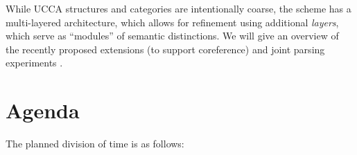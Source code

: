 \documentclass[11pt,table]{article}
\begin{document}
While UCCA structures and categories are intentionally coarse, the scheme has a multi-layered architecture, which allows for refinement using additional {\it layers}, which serve as ``modules'' of semantic distinctions.
We will give an overview of the recently proposed extensions
(to support coreference) and joint parsing experiments \cite{prange2019made,prange2019semantically}.


\section{Agenda}\label{sec:agenda}

The planned division of time is as follows:
\end{document}
